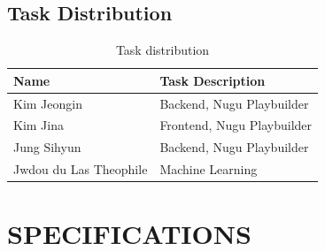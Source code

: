 \documentclass[conference]{IEEEtran}
\begin{document}
\subsection{Task Distribution}
\begin{table}[h]
\centering
\caption{Task distribution}
\begin{tabular}[t]{ll}
\toprule
Name&Task Description\\
\midrule
Kim Jeongin&Backend, Nugu Playbuilder\\
Kim Jina&Frontend, Nugu Playbuilder\\
Jung Sihyun&Backend, Nugu Playbuilder\\
Jwdou du Las Theophile&Machine Learning\\
\bottomrule
\end{tabular}
\end{table}%



\section{SPECIFICATIONS}
\end{document}
